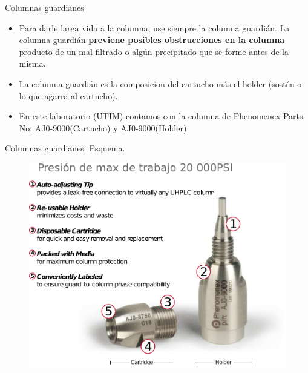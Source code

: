 \documentclass[11pt]{beamer}
\begin{document}
      \begin{frame}{Columnas guardianes}
          \begin{itemize}
              \item Para darle larga vida a la columna, use siempre la columna guardián. La columna guardián \textbf{previene posibles obstrucciones en la columna} producto de un mal filtrado o algún precipitado que se forme antes de la misma.
              \item La columna guardián es la composicion del cartucho más el holder (sostén o lo que agarra al cartucho).
              \item En este laboratorio (UTIM) contamos con la columna de Phenomenex Parts No: AJ0-9000(Cartucho) y AJ0-9000(Holder).
          \end{itemize}

      \end{frame}
      \begin{frame}{Columnas guardianes. Esquema.}
          \begin{figure}
              \centering
              \includegraphics[width=0.9\linewidth]{img/drawing_1}
              \label{fig:drawing1}
          \end{figure}
      \end{frame}
\end{document}
